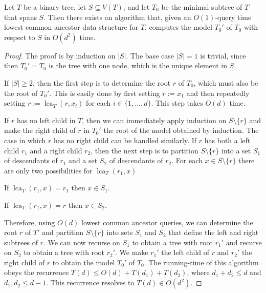 \documentclass{patmorin}
\DeclareMathOperator{\lca}{lca}
\begin{document}

\begin{lem}\label{reconstruction}
  Let $T$ be a binary tree, let $S\subseteq V(T)$, and let $T_0$ be the minimal subtree of $T$ that spans $S$. Then there exists an algorithm that, given an $O(1)$-query time lowest common ancestor data structure for $T$,  computes the model $T_0'$ of $T_0$ with respect to $S$ in $O(d^2)$ time.
\end{lem}

\begin{proof}
  The proof is by induction on $|S|$.  The base case $|S|=1$ is trivial, since then $T_0'=T_0$ is the tree with one node, which is the unique element in $S$.

  If $|S|\ge 2$, then the first step is to determine the root $r$ of $T_0$, which must also be the root of $T_0'$.  This is easily done by first setting $r:=x_1$ and then repeatedly setting $r:=\lca_{T}(r,x_i)$ for each $i\in\{1,\ldots,d\}$. This step takes $O(d)$ time.

  If $r$ has no left child in $T$, then we can immediately apply induction on $S\setminus\{r\}$ and make the right child of $r$ in $T_0'$ the root of the model obtained by induction.  The case in which $r$ has no right child can be handled similarly. If $r$ has both a left child $r_1$ and a right child $r_2$, then the next step is to partition $S\setminus\{r\}$ into a set $S_1$ of descendants of $r_1$ and a set $S_2$ of descendants of $r_2$.   For each $x\in S\setminus\{r\}$ there are only two possibilities for $\lca_{T}(r_1,x)$
  \begin{compactenum}
    \item If $\lca_{T}(r_1,x)=r_1$ then $x\in S_1$.
    \item If $\lca_{T}(r_1,x)=r$ then $x\in S_2$.
  \end{compactenum}
  Therefore, using $O(d)$ lowest common ancestor queries, we can determine the root $r$ of $T'$ and partition $S\setminus\{r\}$ into sets $S_1$ and $S_2$ that define the left and right subtrees of $r$.  We can now recurse on $S_1$ to obtain a tree with root $r_1'$ and recurse on $S_2$ to obtain a tree with root $r_2'$.  We make $r_1'$ the left child of $r$ and $r_2'$ the right child of $r$ to obtain the model $T_0'$ of $T_0$.  The running-time of this  algorithm obeys the recurrence $T(d)\le O(d)+T(d_1) + T(d_2)$, where $d_1 + d_2 \leq d$ and $d_1, d_2 \leq d-1$.  This recurrence resolves to $T(d)\in O(d^2)$.
\end{proof}
\end{document}

